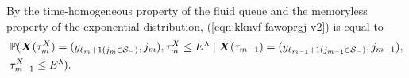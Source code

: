 By the time-homogeneous property of the fluid queue and the memoryless property of the exponential distribution, (\ref{eqn:kknvf fawoprgj v2}) is equal to 
\begin{align}
	&\mathbb P(\boldsymbol X(\tau_m^X) =( y_{\ell_{m}+1(j_m\in\mathcal{S}_-)},j_m), \tau_{m}^X\leq E^\lambda 
		\mid \boldsymbol X(\tau_{m-1}) = (y_{\ell_{m-1}+1(j_{m-1}\in\mathcal{S}_-)}, j_{m-1}), \nonumber
	\\&\tau_{m-1}^X\leq E^\lambda ).\label{eqn: lim 12}
\end{align}

